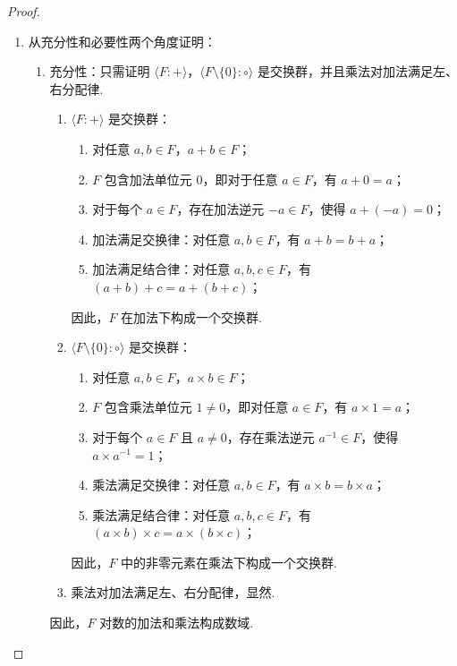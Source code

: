 \begin{proof}
\begin{enumerate}
    \item 从充分性和必要性两个角度证明：
    \begin{enumerate}
        \item 充分性：只需证明 $\langle F\colon+\rangle$，$\langle F\setminus\{0\}\colon\circ\rangle$ 是交换群，并且乘法对加法满足左、右分配律.
        \begin{enumerate}
            \item $\langle F\colon+\rangle$ 是交换群：
            \begin{enumerate}
                \item 对任意 $a, b \in F$，$a + b \in F$；
                \item $F$ 包含加法单位元 $0$，即对于任意 $a \in F$，有 $a + 0 = a$；
                \item 对于每个 $a \in F$，存在加法逆元 $-a \in F$，使得 $a + (-a) = 0$；
                \item 加法满足交换律：对任意 $a, b \in F$，有 $a + b = b + a$；
                \item 加法满足结合律：对任意 $a, b, c \in F$，有 $(a + b) + c = a + (b + c)$；
            \end{enumerate}
            因此，$F$ 在加法下构成一个交换群.
            \item $\langle F\setminus\{0\}\colon\circ\rangle$ 是交换群：
            \begin{enumerate}
                \item 对任意 $a, b \in F$，$a \times b \in F$；
                \item $F$ 包含乘法单位元 $1 \neq 0$，即对任意 $a \in F$，有 $a \times 1 = a$；
                \item 对于每个 $a \in F$ 且 $a \neq 0$，存在乘法逆元 $a^{-1} \in F$，使得 $a \times a^{-1} = 1$；
                \item 乘法满足交换律：对任意 $a, b \in F$，有 $a \times b = b \times a$；
                \item 乘法满足结合律：对任意 $a, b, c \in F$，有 $(a \times b) \times c = a \times (b \times c)$；
            \end{enumerate}
            因此，$F$ 中的非零元素在乘法下构成一个交换群.
            \item 乘法对加法满足左、右分配律，显然.
        \end{enumerate}
        因此，$F$ 对数的加法和乘法构成数域.


\end{enumerate}
\end{enumerate}
\end{proof}
